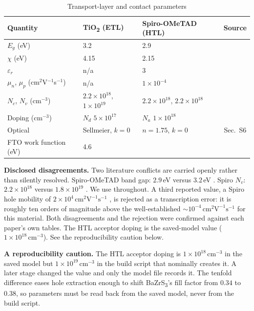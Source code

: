 \documentclass[lettersize,journal,onecolumn]{IEEEtran}
\newcommand{\BZS}{BaZrS\textsubscript{3}}
\newcommand{\TiOx}{TiO\textsubscript{2}}
\begin{document}
\begin{table}[!ht]
\caption{Transport-layer and contact parameters}
\centering\small
\begin{tabular}{lllc}
\toprule
Quantity & \TiOx{} (ETL) & Spiro-OMeTAD (HTL) & Source \\
\midrule
$E_g$ (eV)                        & 3.2  & 2.9  & \cite{usman2024,rahman2023} \\
$\chi$ (eV)                      & 4.15 & 2.15 & \cite{usman2024,rahman2023} \\
$\varepsilon_r$                  & n/a  & 3    & \cite{rahman2023} \\
$\mu_n$, $\mu_p$ (cm$^2$V$^{-1}$s$^{-1}$) & n/a & $1\times10^{-4}$ & \cite{rahman2023} \\
$N_c$, $N_v$ (cm$^{-3}$)          & $2.2\times10^{18}$, $1\times10^{19}$ & $2.2\times10^{18}$, $2.2\times10^{18}$ & \cite{rahman2023,usman2024} \\
Doping (cm$^{-3}$)                & $N_d$ $5\times10^{17}$ & $N_a$ $1\times10^{18}$ & \cite{rahman2023} \\
Optical                           & Sellmeier, $k=0$~\cite{devore1951} & $n=1.75$, $k=0$ & Sec.~S6 \\
FTO work function (eV)            & \multicolumn{2}{l}{4.6} & \cite{rahman2023} \\
\bottomrule
\end{tabular}
\end{table}

\textbf{Disclosed disagreements.} Two literature conflicts are carried openly
rather than silently resolved. Spiro-OMeTAD band gap: $2.9$\,eV
\cite{rahman2023} versus $3.2$\,eV \cite{tiwari2022}. Spiro $N_v$:
$2.2\times10^{18}$ \cite{rahman2023} versus $1.8\times10^{19}$
\cite{tiwari2022}. We use \cite{rahman2023} throughout. A third reported
value, a Spiro hole mobility of $2\times10^{4}\,\mathrm{cm^2V^{-1}s^{-1}}$
\cite{tiwari2022}, is rejected as a transcription error: it is roughly ten
orders of magnitude above the well-established
${\sim}10^{-4}\,\mathrm{cm^2V^{-1}s^{-1}}$ for this material. Both
disagreements and the rejection were confirmed against each paper's own
tables. The HTL acceptor doping is the saved-model
value ($1\times10^{18}\,\mathrm{cm^{-3}}$). See the reproducibility caution
below.

\textbf{A reproducibility caution.} The HTL acceptor doping is
$1\times10^{18}\,\mathrm{cm^{-3}}$ in the saved model but
$1\times10^{19}\,\mathrm{cm^{-3}}$ in the build script that nominally
creates it. A later stage changed the value and only the model file records
it. The tenfold difference eases hole extraction enough to shift \BZS's
fill factor from $0.34$ to $0.38$, so parameters must be read back from the
saved model, never from the build script.
\end{document}
